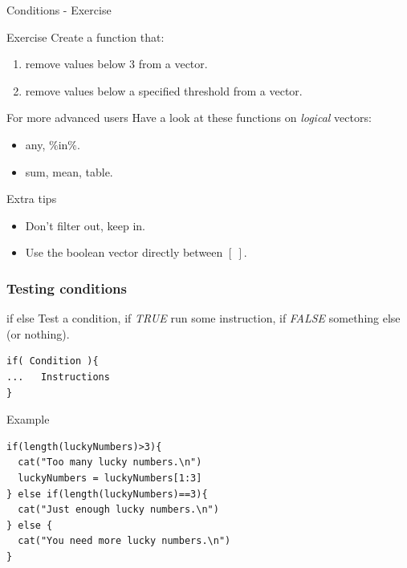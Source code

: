 \documentclass[10pt]{beamer}
\newenvironment{xframe}[2][]
  {\begin{frame}[fragile,environment=xframe,#1]
  \frametitle{#2}}
  {\end{frame}}
\begin{document}
\begin{frame}{Conditions - Exercise}
  \begin{block}{Exercise}
  Create a function that: 
  \begin{enumerate}
  \item remove values below $3$ from a {\sf vector}.
  \item  remove values below a specified threshold from a {\sf vector}.
  \end{enumerate}
  \end{block}

  \bigskip

  \begin{block}{For more advanced users}
    Have a look at these functions on {\it logical} vectors:
    \begin{itemize}
    \item any, $\%$in$\%$.
    \item sum, mean, table.
    \end{itemize}
  \end{block}

  \bigskip

  \begin{block}{Extra tips}
    \begin{itemize}
    \item Don't filter out, keep in.
    \item Use the boolean vector directly between $[~]$.
    \end{itemize}
  \end{block}
\end{frame}



\begin{xframe}{Testing conditions}
  \begin{block}{{\sf if else}}
    Test a condition, if {\it TRUE} run some instruction, if {\it FALSE} something else (or nothing).
\begin{verbatim}
if( Condition ){
...   Instructions
} 
\end{verbatim}  
  \end{block}
  \begin{exampleblock}{Example}
\begin{verbatim}
if(length(luckyNumbers)>3){
  cat("Too many lucky numbers.\n")
  luckyNumbers = luckyNumbers[1:3]
} else if(length(luckyNumbers)==3){
  cat("Just enough lucky numbers.\n")
} else {
  cat("You need more lucky numbers.\n")
}
\end{verbatim}  
  \end{exampleblock}
\end{xframe}
\end{document}
